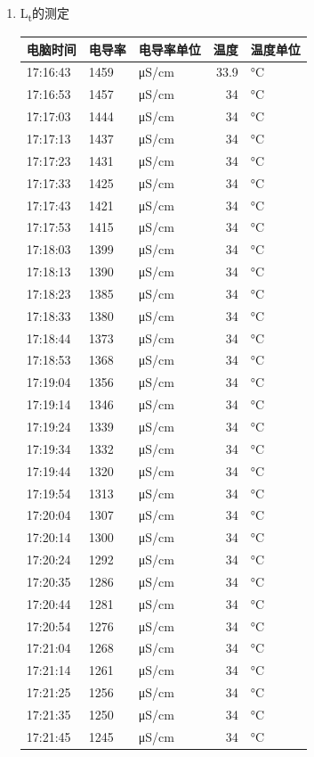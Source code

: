 \documentclass[11pt]{article}
\begin{document}
\begin{enumerate}
\item L\textsubscript{t}的测定
\label{sec:orgced6ae1}
\begin{center}
\begin{tabular}{l|lp{3cm}r|l}
电脑时间 & 电导率 & 电导率单位 & 温度 & 温度单位\\
\hline
17:16:43 & 1459 & μS/cm & 33.9 & °C\\
17:16:53 & 1457 & μS/cm & 34 & °C\\
17:17:03 & 1444 & μS/cm & 34 & °C\\
17:17:13 & 1437 & μS/cm & 34 & °C\\
17:17:23 & 1431 & μS/cm & 34 & °C\\
17:17:33 & 1425 & μS/cm & 34 & °C\\
17:17:43 & 1421 & μS/cm & 34 & °C\\
17:17:53 & 1415 & μS/cm & 34 & °C\\
17:18:03 & 1399 & μS/cm & 34 & °C\\
17:18:13 & 1390 & μS/cm & 34 & °C\\
17:18:23 & 1385 & μS/cm & 34 & °C\\
17:18:33 & 1380 & μS/cm & 34 & °C\\
17:18:44 & 1373 & μS/cm & 34 & °C\\
17:18:53 & 1368 & μS/cm & 34 & °C\\
17:19:04 & 1356 & μS/cm & 34 & °C\\
17:19:14 & 1346 & μS/cm & 34 & °C\\
17:19:24 & 1339 & μS/cm & 34 & °C\\
17:19:34 & 1332 & μS/cm & 34 & °C\\
17:19:44 & 1320 & μS/cm & 34 & °C\\
17:19:54 & 1313 & μS/cm & 34 & °C\\
17:20:04 & 1307 & μS/cm & 34 & °C\\
17:20:14 & 1300 & μS/cm & 34 & °C\\
17:20:24 & 1292 & μS/cm & 34 & °C\\
17:20:35 & 1286 & μS/cm & 34 & °C\\
17:20:44 & 1281 & μS/cm & 34 & °C\\
17:20:54 & 1276 & μS/cm & 34 & °C\\
17:21:04 & 1268 & μS/cm & 34 & °C\\
17:21:14 & 1261 & μS/cm & 34 & °C\\
17:21:25 & 1256 & μS/cm & 34 & °C\\
17:21:35 & 1250 & μS/cm & 34 & °C\\
17:21:45 & 1245 & μS/cm & 34 & °C\\

\end{tabular}
\end{center}
\end{enumerate}
\end{document}
